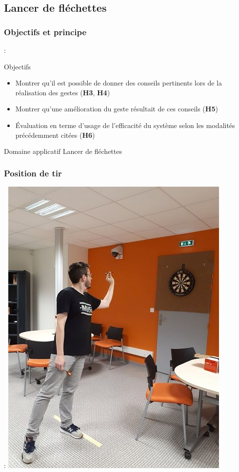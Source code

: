 \documentclass[svgnames]{beamer}
\begin{document}
	\subsection{Lancer de fléchettes}
	\subsubsection{Objectifs et principe}
	\begin{frame}{\subsecname : \MakeLowercase{\subsubsecname}}
		\begin{block}{Objectifs}
			\begin{itemize}[label=$\bullet$]
				\item Montrer qu'il est possible de donner des conseils pertinents lors de la réalisation des gestes (\textbf{H3}, \textbf{H4})
			 	\item Montrer qu'une amélioration du geste résultait de ces conseils (\textbf{H5})
			 	\item Évaluation en terme d'usage de l'efficacité du système selon les modalités précédemment citées (\textbf{H6})
			 \end{itemize}
		\end{block}
	
		\begin{block}{Domaine applicatif}
			Lancer de fléchettes
		\end{block}
		
	\end{frame}
	
	\subsubsection{Position de tir}
	\begin{frame}{\subsecname : \MakeLowercase{\subsubsecname}}
		\centering
		\includegraphics[scale=0.3]{img/darts_position_alt.jpg}
	\end{frame}
	
\end{document}
